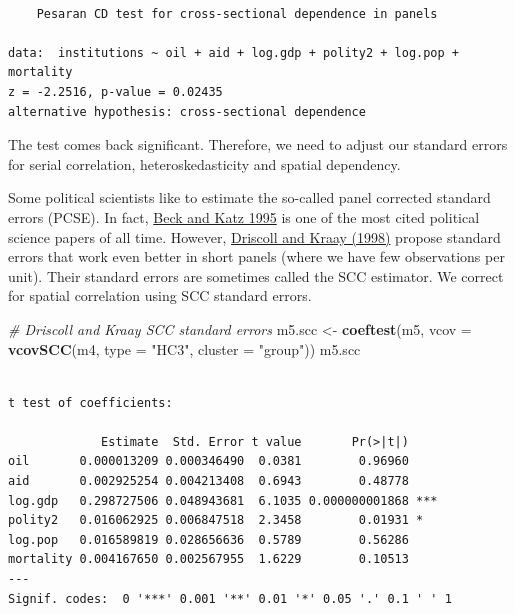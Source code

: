 \documentclass[]{article}
\newenvironment{Shaded}{\begin{snugshade}}{\end{snugshade}}
\newcommand{\KeywordTok}[1]{\textcolor[rgb]{0.13,0.29,0.53}{\textbf{#1}}}
\newcommand{\DataTypeTok}[1]{\textcolor[rgb]{0.13,0.29,0.53}{#1}}
\newcommand{\StringTok}[1]{\textcolor[rgb]{0.31,0.60,0.02}{#1}}
\newcommand{\CommentTok}[1]{\textcolor[rgb]{0.56,0.35,0.01}{\textit{#1}}}
\newcommand{\NormalTok}[1]{#1}
\theoremstyle{definition}
\theoremstyle{definition}
\theoremstyle{definition}
\theoremstyle{remark}
\begin{document}
\begin{verbatim}

    Pesaran CD test for cross-sectional dependence in panels

data:  institutions ~ oil + aid + log.gdp + polity2 + log.pop + mortality
z = -2.2516, p-value = 0.02435
alternative hypothesis: cross-sectional dependence
\end{verbatim}

The test comes back significant. Therefore, we need to adjust our
standard errors for serial correlation, heteroskedasticity and spatial
dependency.

Some political scientists like to estimate the so-called panel corrected
standard errors (PCSE). In fact,
\href{https://www.cambridge.org/core/journals/american-political-science-review/article/what-to-do-and-not-to-do-with-timeseries-crosssection-data/0E778B85AB008DAF8D13E0AC63505E37}{Beck
and Katz 1995} is one of the most cited political science papers of all
time. However,
\href{https://www.mitpressjournals.org/doi/abs/10.1162/003465398557825?casa_token=vV9SnvSYao0AAAAA:7wxGG2rWdlkyrCEAmjZ_5jT0fVmr-zvW7mOl9tjr9JN0zaEeH0yV-kIdGIZyVzZ9YIJpL9Qjgdc}{Driscoll
and Kraay (1998)} propose standard errors that work even better in short
panels (where we have few observations per unit). Their standard errors
are sometimes called the SCC estimator. We correct for spatial
correlation using SCC standard errors.

\begin{Shaded}
\begin{Highlighting}[]
\CommentTok{# Driscoll and Kraay SCC standard errors}
\NormalTok{m5.scc <-}\StringTok{ }\KeywordTok{coeftest}\NormalTok{(m5, }\DataTypeTok{vcov =} \KeywordTok{vcovSCC}\NormalTok{(m4, }\DataTypeTok{type =} \StringTok{"HC3"}\NormalTok{, }\DataTypeTok{cluster =} \StringTok{"group"}\NormalTok{))}
\NormalTok{m5.scc}
\end{Highlighting}
\end{Shaded}

\begin{verbatim}

t test of coefficients:

             Estimate  Std. Error t value       Pr(>|t|)    
oil       0.000013209 0.000346490  0.0381        0.96960    
aid       0.002925254 0.004213408  0.6943        0.48778    
log.gdp   0.298727506 0.048943681  6.1035 0.000000001868 ***
polity2   0.016062925 0.006847518  2.3458        0.01931 *  
log.pop   0.016589819 0.028656636  0.5789        0.56286    
mortality 0.004167650 0.002567955  1.6229        0.10513    
---
Signif. codes:  0 '***' 0.001 '**' 0.01 '*' 0.05 '.' 0.1 ' ' 1
\end{verbatim}
\end{document}
